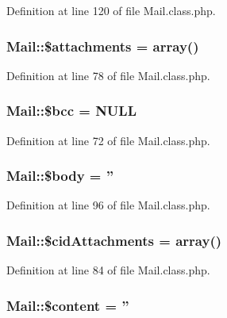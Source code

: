 Definition at line 120 of file Mail.\-class.\-php.

\hypertarget{classMail_a93b05b1003cc8ea16b59c00d77f47466}{
\subsubsection[{\$attachments}]{\setlength{\rightskip}{0pt plus 5cm}Mail\-::\$attachments = array()}}\label{classMail_a93b05b1003cc8ea16b59c00d77f47466}


Definition at line 78 of file Mail.\-class.\-php.

\hypertarget{classMail_a2e25b3c43459422d40765d581b165692}{
\subsubsection[{\$bcc}]{\setlength{\rightskip}{0pt plus 5cm}Mail\-::\$bcc = N\-U\-L\-L}}\label{classMail_a2e25b3c43459422d40765d581b165692}


Definition at line 72 of file Mail.\-class.\-php.

\hypertarget{classMail_acbd542849121b33a76ed63e1c4670e02}{
\subsubsection[{\$body}]{\setlength{\rightskip}{0pt plus 5cm}Mail\-::\$body = ''}}\label{classMail_acbd542849121b33a76ed63e1c4670e02}


Definition at line 96 of file Mail.\-class.\-php.

\hypertarget{classMail_a66c6752b550e4e8fd79a63b62815f48f}{
\subsubsection[{\$cid\-Attachments}]{\setlength{\rightskip}{0pt plus 5cm}Mail\-::\$cid\-Attachments = array()}}\label{classMail_a66c6752b550e4e8fd79a63b62815f48f}


Definition at line 84 of file Mail.\-class.\-php.

\hypertarget{classMail_a5a3320973718a2ca8a3fe798bf79c624}{
\subsubsection[{\$content}]{\setlength{\rightskip}{0pt plus 5cm}Mail\-::\$content = ''}}\label{classMail_a5a3320973718a2ca8a3fe798bf79c624}


